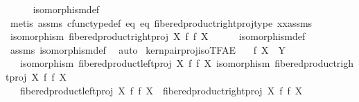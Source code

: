 \begin{isabellebody}
\ \ \ \ \isamarkupfalse%
\ isomorphism{\isacharunderscore}{\kern0pt}def\isanewline
\ \ \ \ \isamarkupfalse%
\ {\isacharparenleft}{\kern0pt}metis\ assms\ cfunc{\isacharunderscore}{\kern0pt}type{\isacharunderscore}{\kern0pt}def\ eq{}\ eq{}\ fibered{\isacharunderscore}{\kern0pt}product{\isacharunderscore}{\kern0pt}right{\isacharunderscore}{\kern0pt}proj{\isacharunderscore}{\kern0pt}type\ xx{\isacharunderscore}{\kern0pt}assms{\isacharparenleft}{\kern0pt}{}{\isacharparenright}{\kern0pt}{\isacharparenright}{\kern0pt}\isanewline
\isanewline
\ \ \isamarkupfalse%
\ \isamarkupfalse%
\ {\isachardoublequoteopen}isomorphism\ {\isacharparenleft}{\kern0pt}fibered{\isacharunderscore}{\kern0pt}product{\isacharunderscore}{\kern0pt}right{\isacharunderscore}{\kern0pt}proj\ X\ f\ f\ X{\isacharparenright}{\kern0pt}{\isachardoublequoteclose}\isanewline
\ \ \ \ \isamarkupfalse%
\ isomorphism{\isacharunderscore}{\kern0pt}def\isanewline
\ \ \ \ \isamarkupfalse%
\ assms{\isacharparenleft}{\kern0pt}{}{\isacharparenright}{\kern0pt}\ isomorphism{\isacharunderscore}{\kern0pt}def\ \isamarkupfalse%
\ auto\isanewline
{}\isamarkupfalse%
%
\endisatagproof
{\isafoldproof}%
%
\isadelimproof
\isanewline
%
\endisadelimproof
\isanewline
{}\isamarkupfalse%
\ kern{\isacharunderscore}{\kern0pt}pair{\isacharunderscore}{\kern0pt}proj{\isacharunderscore}{\kern0pt}iso{\isacharunderscore}{\kern0pt}TFAE{}{\isacharcolon}{\kern0pt}\isanewline
\ \ \ {\isachardoublequoteopen}f{\isacharcolon}{\kern0pt}\ X\ {\isasymrightarrow}\ Y{\isachardoublequoteclose}\isanewline
\ \ \ {\isachardoublequoteopen}isomorphism\ {\isacharparenleft}{\kern0pt}fibered{\isacharunderscore}{\kern0pt}product{\isacharunderscore}{\kern0pt}left{\isacharunderscore}{\kern0pt}proj\ X\ f\ f\ X{\isacharparenright}{\kern0pt}{\isachardoublequoteclose}\ {\isachardoublequoteopen}isomorphism\ {\isacharparenleft}{\kern0pt}fibered{\isacharunderscore}{\kern0pt}product{\isacharunderscore}{\kern0pt}right{\isacharunderscore}{\kern0pt}proj\ X\ f\ f\ X{\isacharparenright}{\kern0pt}{\isachardoublequoteclose}\isanewline
\ \ \ {\isachardoublequoteopen}fibered{\isacharunderscore}{\kern0pt}product{\isacharunderscore}{\kern0pt}left{\isacharunderscore}{\kern0pt}proj\ X\ f\ f\ X\ {\isacharequal}{\kern0pt}\ fibered{\isacharunderscore}{\kern0pt}product{\isacharunderscore}{\kern0pt}right{\isacharunderscore}{\kern0pt}proj\ X\ f\ f\ X{\isachardoublequoteclose}\isanewline

\end{isabellebody}
